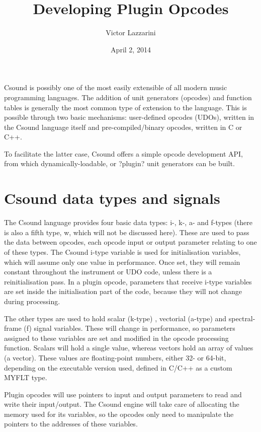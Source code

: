 \documentclass[11pt]{article}
\begin{document}
\title{Developing Plugin Opcodes}
\author{Victor Lazzarini}
\date{April 2, 2014}
\maketitle


Csound is possibly one of the most easily extensible of all modern music programming languages. The addition of unit generators (opcodes) and function tables is generally the most common type of extension to the language. This is possible through two basic mechanisms: user-defined opcodes (UDOs), written in the Csound language itself and pre-compiled/binary opcodes, written in C or C++.  

To facilitate the latter case, Csound offers a simple opcode development API, from which dynamically-loadable, or ?plugin? unit generators can be built. 

\section{ Csound data types and signals}

The Csound language provides four basic data types: i-, k-, a- and f-types  (there is also a fifth type, w, which will not be discussed here). These are used to pass the data between opcodes, each opcode input or output parameter relating to one of these types. The Csound i-type variable is used for initialisation variables, which will assume only one value in performance. Once set, they will remain constant throughout the instrument or UDO code, unless there is a reinitialisation pass. In a plugin opcode, parameters that receive i-type variables are set inside the initialisation part of the code, because they will not change during processing.

The other types are used to hold scalar (k-type) , vectorial (a-type)  and spectral-frame (f) signal variables. These will change in performance, so parameters assigned to these variables are set and modified in the opcode processing function. Scalars will hold a single value, whereas vectors hold an array of values (a vector). These values are floating-point numbers, either 32- or 64-bit, depending on the executable version used, defined in C/C++ as a custom MYFLT type. 

Plugin opcodes will use pointers to input and output parameters to read and write their input/output. The Csound engine will take care of allocating the memory used for its variables, so the opcodes only need to manipulate the pointers to the addresses of these variables. 
\end{document}
